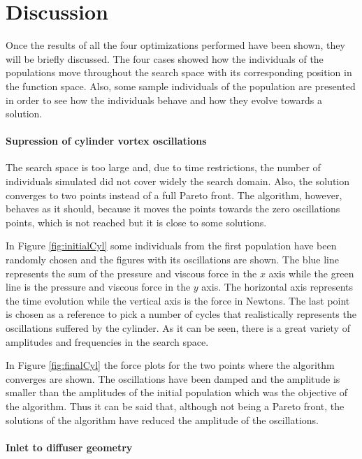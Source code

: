 \chapter{Discussion}

Once the results of all the four optimizations performed have been shown, they will be briefly discussed. The four cases showed how the individuals of the populations move throughout the search space with its corresponding position in the function space. Also, some sample individuals of the population are presented in order to see how the individuals behave and how they evolve towards a solution. 

\subsubsection*{Supression of cylinder vortex oscillations}

The search space is too large and, due to time restrictions, the number of individuals simulated did not cover widely the search domain. Also, the solution converges to two points instead of a full Pareto front. The algorithm, however, behaves as it should, because it moves the points towards the zero oscillations points, which is not reached but it is close to some solutions. 

In Figure \ref{fig:initialCyl} some individuals from the first population have been randomly chosen and the figures with its oscillations are shown. The blue line represents the sum of the pressure and viscous force in the $x$ axis while the green line is the pressure and viscous force in the $y$ axis. The horizontal axis represents the time evolution while the vertical axis is the force in Newtons. The last point is chosen as a reference to pick a number of cycles that realistically represents the oscillations suffered by the cylinder. As it can be seen, there is a great variety of amplitudes and frequencies in the search space.

In Figure \ref{fig:finalCyl} the force plots for the two points where the algorithm converges are shown. The oscillations have been damped and the amplitude is smaller than the amplitudes of the initial population which was the objective of the algorithm. Thus it can be said that, although not being a Pareto front, the solutions of the algorithm have reduced the amplitude of the oscillations. 

\subsubsection*{Inlet to diffuser geometry}

